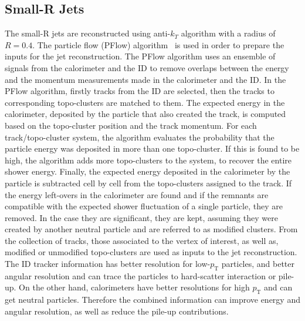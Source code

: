 \subsection{Small-R Jets}
\label{subsec:sRjets}
The small-R jets are reconstructed using anti-$k_T$ algorithm with a radius of $R = 0.4$. The particle flow (PFlow) algorithm~\cite{PERF-2015-09} is used in order to prepare the inputs for the jet reconstruction.
The PFlow algorithm uses an ensemble of signals from the calorimeter and the ID to remove overlaps between the energy and the momentum measurements made in the calorimeter and the ID.
In the PFlow algorithm, firstly tracks from the ID are selected, then the tracks to corresponding topo-clusters are matched to them. 
The expected energy in the calorimeter, deposited by the particle that also created the track, is computed based on the topo-cluster position and the track momentum. For each track/topo-cluster system, the algorithm evaluates the probability that the particle energy was deposited in more than one topo-cluster. If this is found to be high, the algorithm adds more topo-clusters to the system, to recover the entire shower energy.
Finally, the expected energy deposited in the calorimeter by the particle is subtracted cell by cell from the topo-clusters assigned to the track.
If the energy left-overs in the calorimeter are found and if the remnants are compatible with the expected shower fluctuation of a single particle, they are removed. In the case they are significant, they are kept, assuming they were created by another neutral particle and are referred to as modified clusters. From the collection of tracks, those associated to the vertex of interest, as well as, modified or unmodified topo-clusters are used as inputs to the jet reconstruction.
The ID tracker information has better resolution for low-$p_\mathrm{T}$ particles, and better angular resolution and can trace the particles to hard-scatter
interaction or pile-up. On the other hand, calorimeters have better resolutions for high $p_\mathrm{T}$ and can get neutral particles. 
Therefore the combined information can improve energy and angular resolution, as well as reduce the pile-up contributions.

